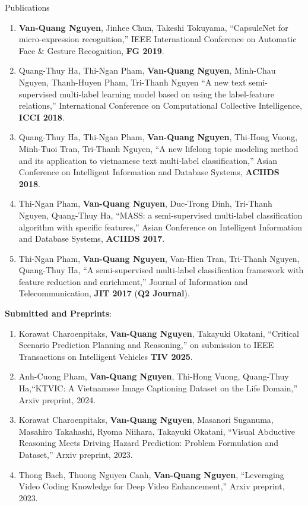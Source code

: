 \documentclass{resume} %
\begin{document}
\begin{rSection}{Publications}
\begin{enumerate}
\item \textbf{Van-Quang Nguyen}, Jinhee Chun, Takeshi Tokuyama, “CapsuleNet for micro-expression recognition,” IEEE International Conference on Automatic Face \& Gesture Recognition, \textbf{FG 2019}. 

\item Quang-Thuy Ha, Thi-Ngan Pham, \textbf{Van-Quang Nguyen}, Minh-Chau Nguyen, Thanh-Huyen Pham, Tri-Thanh Nguyen “A new text semi-supervised multi-label learning model based on using the label-feature relations,” International Conference on Computational Collective Intelligence, \textbf{ICCI 2018}.

\item Quang-Thuy Ha, Thi-Ngan Pham, \textbf{Van-Quang Nguyen}, Thi-Hong Vuong, Minh-Tuoi Tran, Tri-Thanh Nguyen, “A new lifelong topic modeling method and its application to vietnamese text multi-label classification,” Asian Conference on Intelligent Information and Database Systems, \textbf{ACIIDS 2018}.

\item Thi-Ngan Pham, \textbf{Van-Quang Nguyen}, Duc-Trong Dinh, Tri-Thanh Nguyen, Quang-Thuy Ha, “MASS: a semi-supervised multi-label classification algorithm with specific features,” Asian Conference on Intelligent Information and Database Systems, \textbf{ACIIDS 2017}.

\item Thi-Ngan Pham, \textbf{Van-Quang Nguyen}, Van-Hien Tran, Tri-Thanh Nguyen, Quang-Thuy Ha, “A semi-supervised multi-label classification framework with feature reduction and enrichment,” Journal of Information and Telecommunication, \textbf{JIT 2017} (\textbf{Q2 Journal}).
\end{enumerate}
{\large \bf Submitted and Preprints}:
\begin{enumerate}
    \item Korawat Charoenpitaks, \textbf{Van-Quang Nguyen}, Takayuki Okatani, ``Critical Scenario Prediction Planning and Reasoning,'' on submission to IEEE Transactions on Intelligent Vehicles \textbf{TIV 2025}.
    
    \item Anh-Cuong Pham, \textbf{Van-Quang Nguyen}, Thi-Hong Vuong, Quang-Thuy Ha,``KTVIC: A Vietnamese Image Captioning Dataset on the Life Domain,'' Arxiv preprint, 2024.
    \item Korawat Charoenpitaks, \textbf{Van-Quang Nguyen}, Masanori Suganuma, Masahiro Takahashi, Ryoma Niihara, Takayuki Okatani, ``Visual Abductive Reasoning Meets Driving Hazard Prediction: Problem Formulation and Dataset,'' Arxiv preprint, 2023.
    \item Thong Bach, Thuong Nguyen Canh, \textbf{Van-Quang Nguyen}, ``Leveraging Video Coding Knowledge for Deep Video Enhancement,'' Arxiv preprint, 2023.    
\end{enumerate}

\end{rSection}
\end{document}
